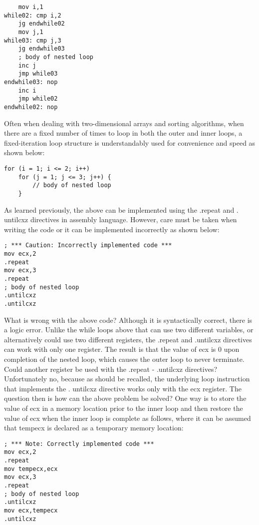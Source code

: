 \documentclass[10pt]{article}
\begin{document}
\begin{verbatim}
    mov i,1
while02: cmp i,2
    jg endwhile02
    mov j,1
while03: cmp j,3
    jg endwhile03
    ; body of nested loop
    inc j
    jmp while03
endwhile03: nop
    inc i
    jmp while02
endwhile02: nop
\end{verbatim}

Often when dealing with two-dimensional arrays and sorting algorithms, when there are a fixed number of times to loop in both the outer and inner loops, a fixed-iteration loop structure is understandably used for convenience and speed as shown below:

\begin{verbatim}
for (i = 1; i <= 2; i++)
    for (j = 1; j <= 3; j++) {
        // body of nested loop
    }
\end{verbatim}

As learned previously, the above can be implemented using the .repeat and . untilcxz directives in assembly language. However, care must be taken when writing the code or it can be implemented incorrectly as shown below:

\begin{verbatim}
; *** Caution: Incorrectly implemented code ***
mov ecx,2
.repeat
mov ecx,3
.repeat
; body of nested loop
.untilcxz
.untilcxz
\end{verbatim}

What is wrong with the above code? Although it is syntactically correct, there is a logic error. Unlike the while loops above that can use two different variables, or alternatively could use two different registers, the .repeat and .untilcxz directives can work with only one register. The result is that the value of ecx is 0 upon completion of the nested loop, which causes the outer loop to never terminate. Could another register be used with the .repeat - .untilcxz directives? Unfortunately no, because as should be recalled, the underlying loop instruction that implements the . untilcxz directive works only with the ecx register. The question then is how can the above problem be solved? One way is to store the\\
value of ecx in a memory location prior to the inner loop and then restore the value of ecx when the inner loop is complete as follows, where it can be assumed that tempecx is declared as a temporary memory location:

\begin{verbatim}
; *** Note: Correctly implemented code ***
mov ecx,2
.repeat
mov tempecx,ecx
mov ecx,3
.repeat
; body of nested loop
.untilcxz
mov ecx,tempecx
.untilcxz
\end{verbatim}
\end{document}
